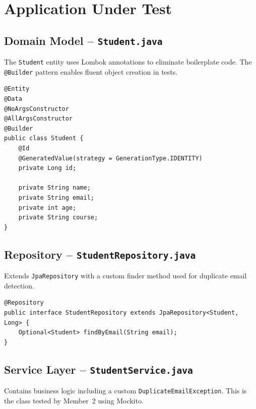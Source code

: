 \documentclass[12pt,a4paper]{article}
\begin{document}
\section{Application Under Test}

\subsection{Domain Model -- \texttt{Student.java}}

The \texttt{Student} entity uses Lombok annotations to eliminate boilerplate code. The \texttt{@Builder} pattern enables fluent object creation in tests.

\begin{lstlisting}[style=javastyle, caption={Student entity model}]
@Entity
@Data
@NoArgsConstructor
@AllArgsConstructor
@Builder
public class Student {
    @Id
    @GeneratedValue(strategy = GenerationType.IDENTITY)
    private Long id;
    
    private String name;
    private String email;
    private int age;
    private String course;
}
\end{lstlisting}

\subsection{Repository -- \texttt{StudentRepository.java}}

Extends \texttt{JpaRepository} with a custom finder method used for duplicate email detection.

\begin{lstlisting}[style=javastyle, caption={Student repository interface}]
@Repository
public interface StudentRepository extends JpaRepository<Student, Long> {
    Optional<Student> findByEmail(String email);
}
\end{lstlisting}

\subsection{Service Layer -- \texttt{StudentService.java}}

Contains business logic including a custom \texttt{DuplicateEmailException}. This is the class tested by Member~2 using Mockito.
\end{document}
